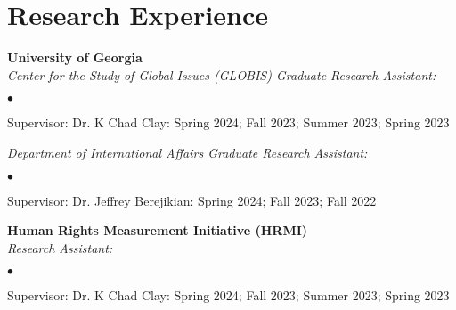 \documentclass[letterpaper,12pt]{article}
\newenvironment{list2}{
  \begin{list}{$\bullet$}{%
      \setlength{\itemsep}{0in}
      \setlength{\parsep}{0in} \setlength{\parskip}{0in}
      \setlength{\topsep}{0in} \setlength{\partopsep}{0in} 
      \setlength{\leftmargin}{0.5in}}}{\end{list}}
\begin{document}
\section{Research Experience}
\textbf{University of Georgia}\\
\textit{Center for the Study of Global Issues (GLOBIS) Graduate Research Assistant:}
\begin{list2}
    \item Supervisor: Dr. K Chad Clay: Spring 2024; Fall 2023; Summer 2023; Spring 2023
\end{list2}
\par
\textit{Department of International Affairs Graduate Research Assistant:}
\begin{list2}
    \item Supervisor: Dr. Jeffrey Berejikian: Spring 2024; Fall 2023; Fall 2022
\end{list2}
\par
\textbf{Human Rights Measurement Initiative (HRMI)}\\
\textit{Research Assistant:}
\begin{list2}
    \item Supervisor: Dr. K Chad Clay: Spring 2024; Fall 2023; Summer 2023; Spring 2023
\end{list2}

\end{document}
